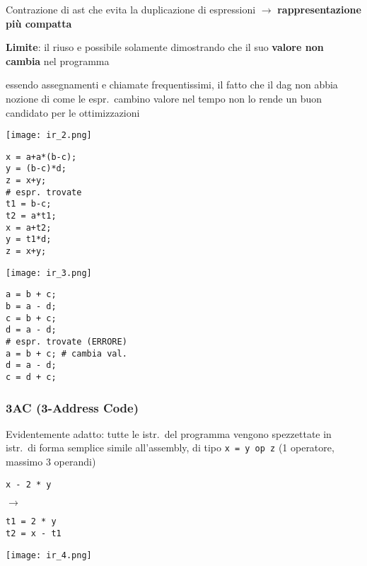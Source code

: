 Contrazione di ast che evita la duplicazione di espressioni $\rightarrow$ \textbf{rappresentazione pi\`u compatta}

\noindent\textbf{Limite}: il riuso e possibile solamente dimostrando che il suo \textbf{valore non cambia} nel programma
\begin{emphasize}
  essendo assegnamenti e chiamate frequentissimi, il fatto che il dag non abbia nozione di come le espr.~cambino valore nel tempo non lo rende un buon candidato per le ottimizzazioni
\end{emphasize}

\begin{example}[frametitle={Esempi}]
  \noindent\begin{minipage}[c]{.18\textwidth}
    \texttt{[image: ir\_2.png]}
  \end{minipage}
  \begin{minipage}[c]{.23\textwidth}
    \begin{lstlisting}
x = a+a*(b-c);
y = (b-c)*d;
z = x+y;
# espr. trovate
t1 = b-c;
t2 = a*t1;
x = a+t2;
y = t1*d;
z = x+y;\end{lstlisting}
  \end{minipage}\hfill\vline\hfill
  \begin{minipage}[c]{.18\textwidth}
    \texttt{[image: ir\_3.png]}
  \end{minipage}
  \begin{minipage}[c]{.35\textwidth}
    \begin{lstlisting}
a = b + c;
b = a - d;
c = b + c;
d = a - d;
# espr. trovate (ERRORE)
a = b + c; # cambia val.
d = a - d;
c = d + c;\end{lstlisting}
  \end{minipage}
\end{example}



\subsubsection{3AC (3-Address Code)}

\begin{minipage}[c]{.65\textwidth}
  Evidentemente adatto: tutte le istr.~del programma vengono spezzettate in istr.~di forma semplice simile all'assembly, di tipo \lstinline|x = y op z| (1 operatore, massimo 3 operandi)

  \noindent\hfill
  \begin{minipage}[c]{.3\textwidth}
    \begin{lstlisting}
x - 2 * y\end{lstlisting}
  \end{minipage}\hfill
  $\rightarrow$\hfill
  \begin{minipage}[c]{.32\textwidth}
    \begin{lstlisting}
t1 = 2 * y
t2 = x - t1\end{lstlisting}
  \end{minipage}\hfill
\end{minipage}
\hfill
\begin{minipage}[c]{.3\textwidth}
  \texttt{[image: ir\_4.png]}
\end{minipage}

